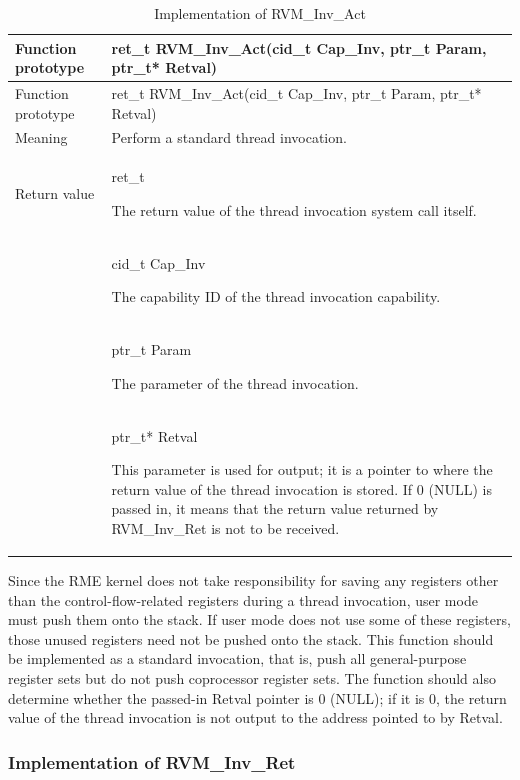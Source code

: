 \begin{xltabular}{\textwidth}{@{}>{\hsize\raggedright\arraybackslash}X>{\hsize\raggedright\arraybackslash}X@{}}
\caption{Implementation of RVM\_\allowbreak{}Inv\_\allowbreak{}Act}\label{tab:8-10}\\
\toprule
Function prototype & ret\_\allowbreak{}t RVM\_\allowbreak{}Inv\_\allowbreak{}Act(cid\_\allowbreak{}t Cap\_\allowbreak{}Inv, ptr\_\allowbreak{}t Param, ptr\_\allowbreak{}t*
Retval)\tabularnewline
\endfirsthead
\toprule
Function prototype & ret\_\allowbreak{}t RVM\_\allowbreak{}Inv\_\allowbreak{}Act(cid\_\allowbreak{}t Cap\_\allowbreak{}Inv, ptr\_\allowbreak{}t Param, ptr\_\allowbreak{}t*
Retval)\tabularnewline
\midrule
\endhead
\bottomrule
\endlastfoot
Meaning & Perform a standard thread invocation.\tabularnewline
Return value\strut
 & ret\_\allowbreak{}t

The return value of the thread invocation system call itself.\strut
\tabularnewline
{} & cid\_\allowbreak{}t Cap\_\allowbreak{}Inv

The capability ID of the thread invocation capability.\strut
\tabularnewline
\strut
 & ptr\_\allowbreak{}t Param

The parameter of the thread invocation.\strut
\tabularnewline
\strut
 & ptr\_\allowbreak{}t* Retval

This parameter is used for output; it is a pointer to where the return value of the thread invocation is stored. If 0 (NULL) is passed in, it means that the return value returned by RVM\_Inv\_Ret is not to be received.\strut
\tabularnewline
\end{xltabular}

Since the RME kernel does not take responsibility for saving any registers other than the control-flow-related registers during a thread invocation, user mode must push them onto the stack. If user mode does not use some of these registers, those unused registers need not be pushed onto the stack. This function should be implemented as a standard invocation, that is, push all general-purpose register sets but do not push coprocessor register sets. The function should also determine whether the passed-in Retval pointer is 0 (NULL); if it is 0, the return value of the thread invocation is not output to the address pointed to by Retval.

\subsubsection{Implementation of RVM\_Inv\_Ret}\label{subsubsec:8-2-6-5}

